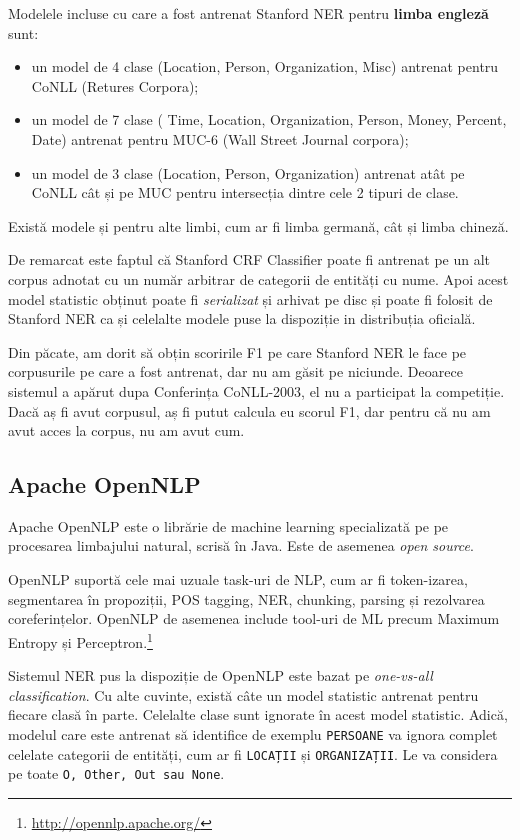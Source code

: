 
Modelele incluse cu care a fost antrenat Stanford NER pentru \textbf{limba engleză} sunt:

\begin{itemize}
\item un model de 4 clase (Location, Person, Organization, Misc) antrenat pentru CoNLL (Retures Corpora);
\item un model de 7 clase (	Time, Location, Organization, Person, Money, Percent, Date) antrenat pentru MUC-6 (Wall Street Journal corpora);
\item un model de 3 clase  (Location, Person, Organization) antrenat atât pe CoNLL cât și pe MUC pentru intersecția dintre cele 2 tipuri de clase.
\end{itemize}

Există modele și pentru alte limbi, cum ar fi limba germană, cât și limba chineză.

De remarcat este faptul că Stanford CRF Classifier poate fi antrenat pe un alt corpus adnotat cu un număr arbitrar de categorii de entități cu nume. Apoi acest model statistic obținut poate fi \textit{serializat} și arhivat pe disc și poate fi folosit de Stanford NER ca și celelalte modele puse la dispoziție in distribuția oficială.

Din păcate, am dorit să obțin scoririle F1 pe care Stanford NER le face pe corpusurile pe care a fost antrenat, dar nu am găsit pe niciunde. Deoarece sistemul a apărut dupa Conferința CoNLL-2003, el nu a participat la competiție. Dacă aș fi avut corpusul, aș fi putut calcula eu scorul F1, dar pentru că nu am avut acces la corpus, nu am avut cum.


\subsection{Apache OpenNLP}

Apache OpenNLP este o librărie de machine learning specializată pe pe procesarea limbajului natural, scrisă în Java. Este de asemenea \textit{open source}.


OpenNLP suportă cele mai uzuale task-uri de NLP, cum ar fi token-izarea, segmentarea în propoziții, POS tagging, NER, chunking, parsing și rezolvarea coreferințelor. OpenNLP de asemenea include tool-uri de ML precum Maximum Entropy și Perceptron.\footnote{\url{http://opennlp.apache.org/}}


Sistemul NER pus la dispoziție de OpenNLP este bazat pe \textit{one-vs-all classification}. Cu alte cuvinte, există câte un model statistic antrenat pentru fiecare clasă în parte. Celelalte clase sunt ignorate în acest model statistic. Adică, modelul care este antrenat să identifice de exemplu \texttt{PERSOANE} va ignora complet celelate categorii de entități, cum ar fi \texttt{LOCAȚII} și \texttt{ORGANIZAȚII}. Le va considera pe toate \texttt{O, Other, Out sau None}.

